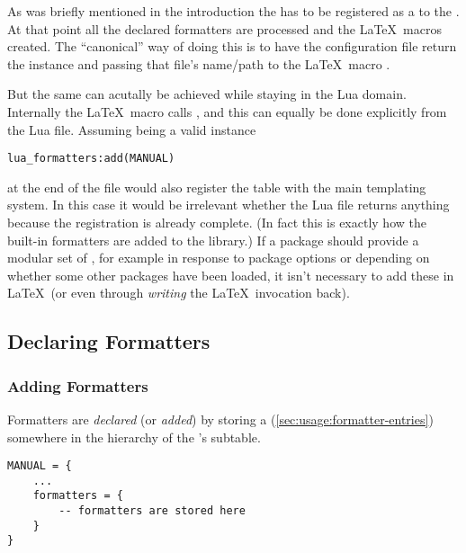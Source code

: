 \documentclass[12pt]{scrartcl}
\begin{document}
As was briefly mentioned in the introduction the  has to be registered as a  to the .  At that point all the declared formatters are processed and the \LaTeX\ macros created.  The “canonical” way of doing this is to have the configuration file return the  instance and passing that file's name/path  to the \LaTeX\ macro \texttt{}.

But the same can acutally be achieved while staying in the Lua domain.
Internally the \LaTeX\ macro calls , and this can
equally be done explicitly from the Lua file.  Assuming  being a
valid  instance

\begin{verbatim}
lua_formatters:add(MANUAL)
\end{verbatim}

\noindent at the end of the file would also register the  table
with the main templating system.  In this case it would be irrelevant whether
the Lua file returns anything because the registration is already complete.  (In
fact this is exactly how the built-in formatters are added to the library.) If a
package should provide a modular set of ,
for example in response to package options or depending on whether some other
packages have been loaded, it isn't necessary to add these in \LaTeX\ (or even
through \emph{writing} the \LaTeX\ invocation back).


\subsection{Declaring Formatters}
\label{sec:usage:declaring-formatters}

\subsubsection{Adding Formatters}
\label{sec:usage-adding-formatters}

Formatters are \emph{declared} (or \emph{added}) by storing a  (\vref{sec:usage:formatter-entries}) somewhere in the hierarchy of the
's  subtable.

\begin{verbatim}
MANUAL = {
	...
	formatters = {
		-- formatters are stored here
	}
}
\end{verbatim}
\end{document}
